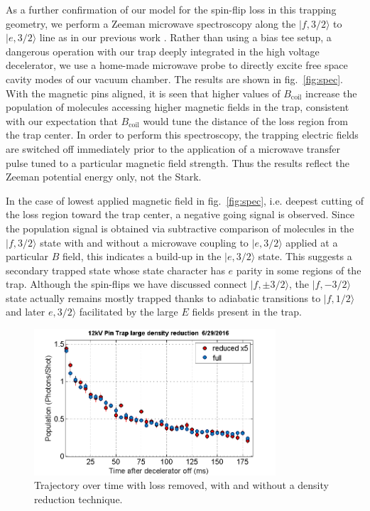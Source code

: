 \documentclass[%
 reprint,
 amsmath,amssymb,
 aps,
prl,
]{revtex4-1}
\begin{document}
As a further confirmation of our model for the spin-flip loss in this trapping geometry, we perform a Zeeman microwave spectroscopy along the $|f,3/2\rangle$ to $|e,3/2\rangle$ line as in our previous work \cite{stuhl2012evap}. Rather than using a bias tee setup, a dangerous operation with our trap deeply integrated in the high voltage decelerator, we use a home-made microwave probe to directly excite free space cavity modes of our vacuum chamber. The results are shown in fig.~\ref{fig:spec}. With the magnetic pins aligned, it is seen that higher values of $B_{\text{coil}}$ increase the population of molecules accessing higher magnetic fields in the trap, consistent with our expectation that $B_\text{coil}$ would tune the distance of the loss region from the trap center. In order to perform this spectroscopy, the trapping electric fields are switched off immediately prior to the application of a microwave transfer pulse tuned to a particular magnetic field strength. Thus the results reflect the Zeeman potential energy only, not the Stark.

In the case of lowest applied magnetic field in fig.~\ref{fig:spec}, i.e. deepest cutting of the loss region toward the trap center, a negative going signal is observed. Since the population signal is obtained via subtractive comparison of molecules in the $|f,3/2\rangle$ state with and without a microwave coupling to $|e,3/2\rangle$ applied at a particular $B$ field, this indicates a build-up in the $|e,3/2\rangle$ state. This suggests a secondary trapped state whose state character has $e$ parity in some regions of the trap. Although the spin-flips we have discussed connect $|f,\pm3/2\rangle$, the $|f,-3/2\rangle$ state actually remains mostly trapped thanks to adiabatic transitions to $|f,1/2\rangle$ and later $e,3/2\rangle$ facilitated by the large $E$ fields present in the trap. 

\begin{figure}
\includegraphics[width=90mm]{reduce-density-compare.png}%
\caption{
Trajectory over time with loss removed, with and without a density reduction technique.
\label{fig:timetrace}}
\end{figure}
\end{document}
